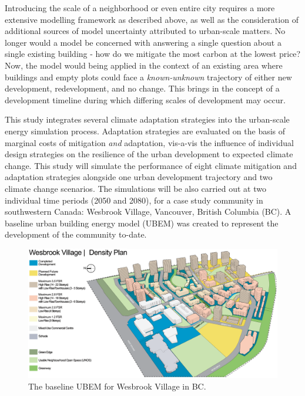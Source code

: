 \documentclass[twocolumn, a4paper,10pt]{article}
\begin{document}
Introducing the scale of a neighborhood or even entire city requires a more extensive modelling framework as described above, as well as the consideration of additional sources of model uncertainty attributed to urban-scale matters. No longer would a model be concerned with answering a single question about a single existing building - how do we mitigate the most carbon at the lowest price? Now, the model would  being applied in the context of an existing area where buildings and empty plots could face a \textit{known-unknown} trajectory of either new development, redevelopment, and no change. This brings in the concept of a development timeline during which differing scales of development may occur.

This study integrates several climate adaptation strategies into the urban-scale energy simulation process. Adaptation strategies are evaluated on the basis of marginal costs of mitigation \textit{and} adaptation, vis-a-vis the influence of individual design strategies on the resilience of the urban development to expected climate change. This study will simulate the performance of eight climate mitigation and adaptation strategies alongside one urban development trajectory and two climate change scenarios. The simulations will be also carried out at two individual time periods (2050 and 2080), for a case study community in southwestern Canada: Wesbrook Village, Vancouver, British Columbia (BC). A baseline urban building energy model (UBEM) was created to represent the development of the community to-date.



\begin{figure}[hbpt]
    \centering
    \includegraphics[scale=0.50]{figures/wesbrook_plan.eps}
    \caption{The baseline UBEM for Wesbrook Village in BC.}
    \label{fig:wesbrook_base}
\end{figure}
\end{document}
